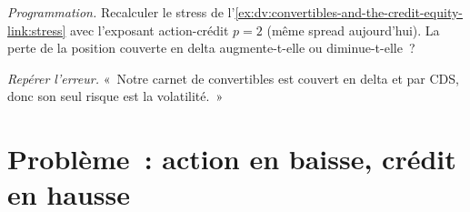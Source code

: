 \begin{exercise}[$\star\star\star$]\label{exo:dv:convertibles-and-the-credit-equity-link:7}
\emph{Programmation.} Recalculer le stress de l'\cref{ex:dv:convertibles-and-the-credit-equity-link:stress} avec l'exposant action-crédit $p=2$ (même
spread aujourd'hui). La perte de la position couverte en delta augmente-t-elle ou diminue-t-elle~?
\end{exercise}

\begin{exercise}[$\star\star\star$]\label{exo:dv:convertibles-and-the-credit-equity-link:8}
\emph{Repérer l'erreur.} «~Notre carnet de convertibles est couvert en delta et par CDS, donc son seul risque est la volatilité.~»
\end{exercise}

\section{Problème~: action en baisse, crédit en hausse}

